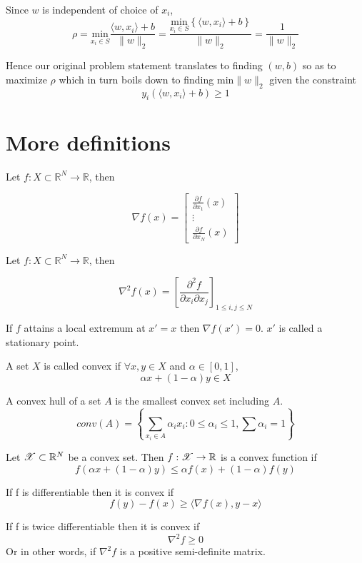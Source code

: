 \documentclass[a4paper,english,12pt]{article}
\begin{document}
Since $w$ is independent of choice of $x_i$,
$$ \rho = \underset{x_i \in S} {\mathrm{min}} \frac{\langle w,x_i \rangle + b}{\| w \|_2} = \frac{\underset{x_i \in S} {\mathrm{min}} \left\{\langle w,x_i \rangle + b\right\}}{\| w \|_2} = \frac{1}{\|w\|_2} $$

Hence our original problem statement translates to finding $(w,b)$ so as to maximize $\rho$ which in turn boils down to finding $\mathrm{min} \|w\|_2$ given the constraint
$$ y_i \left(\langle w,x_i \rangle + b \right) \geq 1 $$

\section{More definitions}

\begin{defn}[Gradient]

Let $f:X\subset\mathbb{R}^N\rightarrow\mathbb{R}$, then

$$ \nabla f(x) = \left[  \begin{array}{ccc} \frac{\partial f}{\partial x_1} (x) \\ \vdots \\ \frac{\partial f}{\partial x_N} (x)
\end{array}  \right] $$

\end{defn}

\begin{defn}[Hessian]

Let $f:X\subset\mathbb{R}^N\rightarrow\mathbb{R}$, then

$$ \nabla ^2 f(x) = \left[  \frac{\partial ^2 f}{\partial x_i \partial x_j}  \right]_{1 \leq i, j \leq N} $$

\end{defn}

\begin{defn}
If $f$ attains a local extremum at $x' = x$ then $\nabla f(x') = 0$. $x'$ is called a stationary point.
\end{defn}

\begin{defn}
A set $X$ is called convex if $\forall x,y \in X$ and $\alpha \in [0,1]$,
$$ \alpha x + (1-\alpha) y \in X $$
\end{defn}

\begin{defn}
A convex hull of a set $A$ is the smallest convex set including $A$.
$$ conv(A) = \left\{ \sum_{x_i \in A} \alpha _i x_i : 0 \leq \alpha _i \leq 1 , \sum \alpha _i = 1 \right\} $$
\end{defn}

\begin{defn}
Let $\mathscr{X} \subset \mathbb{R}^N$ be a convex set. Then $f: \mathscr{X}\rightarrow\mathbb{R}$ is a convex function if
$$ f\left( \alpha x + (1-\alpha)y \right) \leq \alpha f(x) + (1-\alpha) f(y) $$

If f is differentiable then it is convex if
$$ f(y) - f(x) \geq \langle \nabla f(x), {y-x} \rangle $$

If f is twice differentiable then it is convex if
$$ \nabla ^2 f \geq 0 $$
Or in other words, if $\nabla ^2 f$ is a positive semi-definite matrix.
\end{defn}
\end{document}
